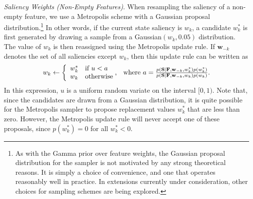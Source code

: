 \documentclass[11pt]{article}
\newcommand{\condon}{|}
\begin{document}
{\it Saliency Weights (Non-Empty Features)}. When resampling the saliency of a non-empty feature, we use a Metropolis scheme with a Gaussian proposal distribution.\footnote{As with the Gamma prior over feature weights, the Gaussian proposal distribution for the sampler is not motivated by any strong theoretical reasons. It is simply a choice of convenience, and one that operates reasonably well in practice. In extensions currently under consideration, other choices for sampling schemes are being explored.} In other words, if the current state saliency is $w_k$, a candidate $w_k^*$ is first generated by drawing a sample from a Gaussian$(w_k, 0.05)$ distribution. The value of $w_k$ is then reassigned using the Metropolis update rule. If $\mathbf{w}_{-k}$ denotes the set of all saliencies except $w_k$, then this update rule can be written as
\begin{equation}
\begin{array}{cc}
w_k \leftarrow \left\{ \begin{array}{rl} w_k^* & \mbox{if } u<a \\ w_k & \mbox{otherwise} \end{array}\right. \!\!\! \mbox{, \hspace*{1mm} where }
a = \frac{p(\mathbf{S} \condon \mathbf{F}, \mathbf{w}_{-k}, w_k^*) p(w_k^*)}{p(\mathbf{S} \condon \mathbf{F}, \mathbf{w}_{-k}, w_k) p(w_k)}.
\end{array}
\end{equation}
In this expression, $u$ is a uniform random variate on the interval $[0,1)$. Note that, since the candidates are drawn from a Gaussian distribution, it is quite possible for the Metropolis sampler to propose replacement values $w_k^*$ that are less than zero. However, the Metropolis update rule will never accept one of these proposals, since $p(w_k^*)=0$ for all $w_k^* < 0$.
\end{document}
